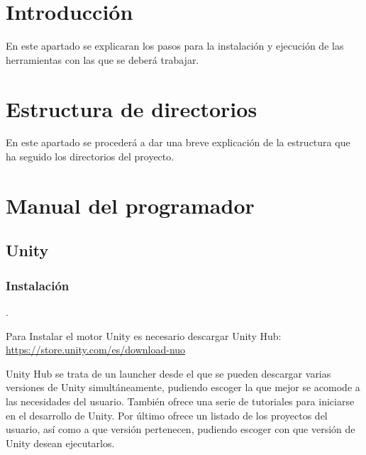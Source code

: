 
\section{Introducción}
En este apartado se explicaran los pasos para la instalación y ejecución de las herramientas con las que se deberá trabajar.

\section{Estructura de directorios}
En este apartado se procederá a dar una breve explicación de la estructura que ha seguido los directorios del proyecto.\\




\section{Manual del programador}
\subsection{Unity}\label{sub:Unity}
\subsubsection{Instalación}.

Para Instalar el motor Unity es necesario descargar Unity Hub: \url{https://store.unity.com/es/download-nuo}

Unity Hub se trata de un launcher desde el que se pueden descargar varias versiones de Unity simultáneamente, pudiendo escoger la que mejor se acomode a las necesidades del usuario. También ofrece una serie de tutoriales para iniciarse en el desarrollo de Unity. Por último ofrece un listado de los proyectos del usuario, así como a que versión pertenecen, pudiendo escoger con que versión de Unity desean ejecutarlos.

